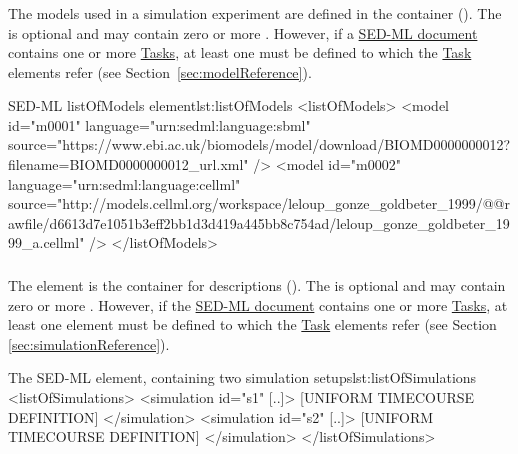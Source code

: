 \subsubsection{}
\label{class:listOfModels}
The models used in a simulation experiment are defined in the  container (). The  is optional and may contain zero or more \Models. However, if a \hyperref[class:sed-ml]{SED-ML document} contains one or more \hyperref[class:abstractTask]{Tasks}, at least one \Model must be defined to which the \hyperref[class:abstractTask]{Task} elements refer (see Section~\ref{sec:modelReference}).


\begin{myXmlLst}{SED-ML listOfModels element}{lst:listOfModels}
<listOfModels>
	<model id="m0001" language="urn:sedml:language:sbml" 
		source="https://www.ebi.ac.uk/biomodels/model/download/BIOMD0000000012?filename=BIOMD0000000012_url.xml" />
	<model id="m0002" language="urn:sedml:language:cellml" 
		source="http://models.cellml.org/workspace/leloup_gonze_goldbeter_1999/@@rawfile/d6613d7e1051b3eff2bb1d3d419a445bb8c754ad/leloup_gonze_goldbeter_1999_a.cellml" />
</listOfModels>
\end{myXmlLst}


\subsubsection{}
\label{class:listOfSimulations}
The  element is the container for \Simulation descriptions (). The  is optional and may contain zero or more \Simulations. However, if the \hyperref[class:sed-ml]{SED-ML document} contains one or more \hyperref[class:abstractTask]{Tasks}, at least one \Simulation element must be defined to which the \hyperref[class:abstractTask]{Task} elements refer (see Section \ref{sec:simulationReference}).

\begin{myXmlLst}{The SED-ML  element, containing two simulation setups}{lst:listOfSimulations}
<listOfSimulations>
	<simulation id="s1" [..]>
		[UNIFORM TIMECOURSE DEFINITION]
	</simulation>
	<simulation id="s2" [..]>
   		[UNIFORM TIMECOURSE DEFINITION]
	</simulation>
</listOfSimulations>
\end{myXmlLst}
 
